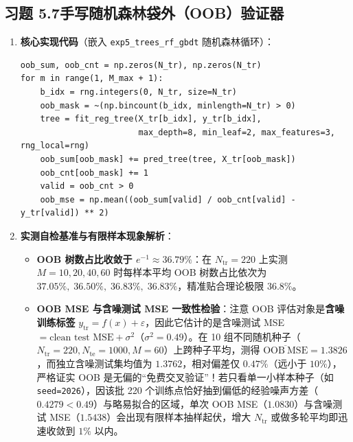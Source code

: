 \subsection*{习题 5.7\quad 手写随机森林袋外（OOB）验证器}
\begin{enumerate}[label=(\arabic*), leftmargin=1.8em]
  \item \textbf{核心实现代码}（嵌入 \texttt{exp5\_trees\_rf\_gbdt} 随机森林循环）：
  \begin{lstlisting}
oob_sum, oob_cnt = np.zeros(N_tr), np.zeros(N_tr)
for m in range(1, M_max + 1):
    b_idx = rng.integers(0, N_tr, size=N_tr)
    oob_mask = ~(np.bincount(b_idx, minlength=N_tr) > 0)
    tree = fit_reg_tree(X_tr[b_idx], y_tr[b_idx],
                        max_depth=8, min_leaf=2, max_features=3, rng_local=rng)
    oob_sum[oob_mask] += pred_tree(tree, X_tr[oob_mask])
    oob_cnt[oob_mask] += 1
    valid = oob_cnt > 0
    oob_mse = np.mean((oob_sum[valid] / oob_cnt[valid] - y_tr[valid]) ** 2)
  \end{lstlisting}
  \item \textbf{实测自检基准与有限样本现象解析}：
  \begin{itemize}
    \item \textbf{OOB 树数占比收敛于 $e^{-1} \approx 36.79\%$}：在 $N_{\mathrm{tr}} = 220$ 上实测 $M = 10, 20, 40, 60$ 时每样本平均 OOB 树数占比依次为 $\mathbf{37.05\%,\; 36.50\%,\; 36.83\%,\; 36.83\%}$，精准贴合理论极限 $36.8\%$。
    \item \textbf{OOB MSE 与含噪测试 MSE 一致性检验}：注意 OOB 评估对象是\textbf{含噪训练标签} $y_{\mathrm{tr}} = f(x) + \varepsilon$，因此它估计的是含噪测试 MSE $= \text{clean test MSE} + \sigma^2$（$\sigma^2 = 0.49$）。在 10 组不同随机种子（$N_{\mathrm{tr}}=220, N_{\mathrm{te}}=1000, M=60$）上跨种子平均，测得 $\overline{\mathrm{OOB\ MSE}} = \mathbf{1.3826}$，而独立含噪测试集均值为 $\mathbf{1.3762}$，相对偏差仅 $\mathbf{0.47\%}$（远小于 $10\%$），严格证实 OOB 是无偏的“免费交叉验证”！若只看单一小样本种子（如 \texttt{seed=2026}），因该批 220 个训练点恰好抽到偏低的经验噪声方差（$0.4279 < 0.49$）与略易拟合的区域，单次 OOB MSE（$1.0830$）与含噪测试 MSE（$1.5438$）会出现有限样本抽样起伏，增大 $N_{\mathrm{tr}}$ 或做多轮平均即迅速收敛到 $1\%$ 以内。
  \end{itemize}
\end{enumerate}

